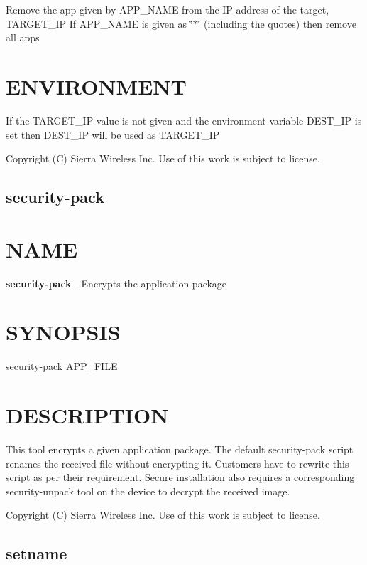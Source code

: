 Remove the app given by A\+P\+P\+\_\+\+N\+A\+M\+E from the I\+P address of the target, T\+A\+R\+G\+E\+T\+\_\+\+I\+P If A\+P\+P\+\_\+\+N\+A\+M\+E is given as \char`\"{}$\ast$\char`\"{} (including the quotes) then remove all apps

\section*{E\+N\+V\+I\+R\+O\+N\+M\+E\+N\+T}

\begin{DoxyVerb}If the TARGET_IP value is not given and the environment variable DEST_IP
is set then DEST_IP will be used as TARGET_IP
\end{DoxyVerb}




 Copyright (C) Sierra Wireless Inc. Use of this work is subject to license. \hypertarget{toolsHost_security-pack}{}\subsection{security-\/pack}\label{toolsHost_security-pack}
\section*{N\+A\+M\+E}

{\bfseries security-\/pack} -\/ Encrypts the application package

\section*{S\+Y\+N\+O\+P\+S\+I\+S}

{\ttfamily security-\/pack A\+P\+P\+\_\+\+F\+I\+L\+E}~\newline


\section*{D\+E\+S\+C\+R\+I\+P\+T\+I\+O\+N}

This tool encrypts a given application package. The default security-\/pack script renames the received file without encrypting it. Customers have to rewrite this script as per their requirement. Secure installation also requires a corresponding security-\/unpack tool on the device to decrypt the received image.



 Copyright (C) Sierra Wireless Inc. Use of this work is subject to license. \hypertarget{toolsHost_setname}{}\subsection{setname}\label{toolsHost_setname}
